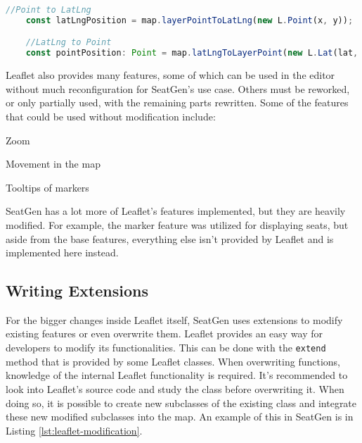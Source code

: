 \begin{lstlisting}[language=TypeScript, caption={Latitude Longitude and Point conversion}, label={lst:latlng-point}]
    //Point to LatLng
    const latLngPosition = map.layerPointToLatLng(new L.Point(x, y));

    //LatLng to Point
    const pointPosition: Point = map.latLngToLayerPoint(new L.Lat(lat, lng));
\end{lstlisting}

Leaflet also provides many features, some of which can be used in the editor without much reconfiguration for SeatGen's use case. Others must be reworked, or only partially used, with the remaining parts rewritten. Some of the features that could be used without modification include:
\begin{compactitem}
\item Zoom
\item Movement in the map
\item Tooltips of markers
\end{compactitem} 

SeatGen has a lot more of Leaflet's features implemented, but they are heavily modified. For example, the marker feature was utilized for displaying seats, but aside from the base features, everything else isn't provided by Leaflet and is implemented here instead.

\subsection{Writing Extensions}
For the bigger changes inside Leaflet itself, SeatGen uses extensions to modify existing features or even overwrite them. Leaflet provides an easy way for developers to modify its functionalities. This can be done with the \texttt{extend} method that is provided by some Leaflet classes. When overwriting functions, knowledge of the internal Leaflet functionality is required. It's recommended to look into Leaflet's source code and study the class before overwriting it. When doing so, it is possible to create new subclasses of the existing class and integrate these new modified subclasses into the map. An example of this in SeatGen is in Listing \ref{lst:leaflet-modification}.

